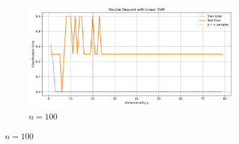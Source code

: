 \documentclass{article}
\begin{document}
\begin{figure}[htb]
\begin{subfigure}[b]{\imgwidth}
  \end{subfigure}%
  \hfill
  \begin{subfigure}[b]{\imgwidth}
    \includegraphics[width=\linewidth]{img_qq/risk_curve_n70.png}
    \caption{$n=100$}\label{fig:2h1}
  \end{subfigure}

  \medskip


\end{figure}
\end{document}
